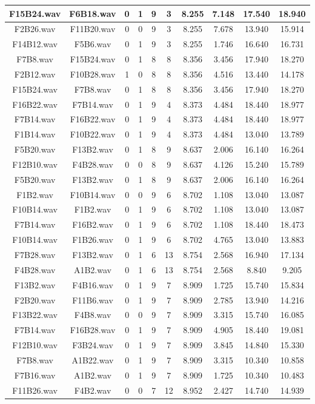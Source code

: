 \documentclass[11pt,a4paper]{book}
\begin{document}
\begin{longtable}[c]{|c|c|c|c|c|c|c|c|c|c|}
F15B24.wav&F6B18.wav&0&1&9&3&8.255&7.148&17.540&18.940\\ \hline
F2B26.wav&F11B20.wav&0&0&9&3&8.255&7.678&13.940&15.914\\ \hline
F14B12.wav&F5B6.wav&0&1&9&3&8.255&1.746&16.640&16.731\\ \hline
F7B8.wav&F15B24.wav&0&1&8&8&8.356&3.456&17.940&18.270\\ \hline
F2B12.wav&F10B28.wav&1&0&8&8&8.356&4.516&13.440&14.178\\ \hline
F15B24.wav&F7B8.wav&0&1&8&8&8.356&3.456&17.940&18.270\\ \hline
F16B22.wav&F7B14.wav&0&1&9&4&8.373&4.484&18.440&18.977\\ \hline
F7B14.wav&F16B22.wav&0&1&9&4&8.373&4.484&18.440&18.977\\ \hline
F1B14.wav&F10B22.wav&0&1&9&4&8.373&4.484&13.040&13.789\\ \hline
F5B20.wav&F13B2.wav&0&1&8&9&8.637&2.006&16.140&16.264\\ \hline
F12B10.wav&F4B28.wav&0&0&8&9&8.637&4.126&15.240&15.789\\ \hline
F5B20.wav&F13B2.wav&0&1&8&9&8.637&2.006&16.140&16.264\\ \hline
F1B2.wav&F10B14.wav&0&0&9&6&8.702&1.108&13.040&13.087\\ \hline
F10B14.wav&F1B2.wav&0&1&9&6&8.702&1.108&13.040&13.087\\ \hline
F7B14.wav&F16B2.wav&0&1&9&6&8.702&1.108&18.440&18.473\\ \hline
F10B14.wav&F1B26.wav&0&1&9&6&8.702&4.765&13.040&13.883\\ \hline
F7B28.wav&F13B2.wav&0&1&6&13&8.754&2.568&16.940&17.134\\ \hline
F4B28.wav&A1B2.wav&0&1&6&13&8.754&2.568&8.840&9.205\\ \hline
F13B2.wav&F4B16.wav&0&1&9&7&8.909&1.725&15.740&15.834\\ \hline
F2B20.wav&F11B6.wav&0&1&9&7&8.909&2.785&13.940&14.216\\ \hline
F13B22.wav&F4B8.wav&0&0&9&7&8.909&3.315&15.740&16.085\\ \hline
F7B14.wav&F16B28.wav&0&1&9&7&8.909&4.905&18.440&19.081\\ \hline
F12B10.wav&F3B24.wav&0&1&9&7&8.909&3.845&14.840&15.330\\ \hline
F7B8.wav&A1B22.wav&0&1&9&7&8.909&3.315&10.340&10.858\\ \hline
F7B16.wav&A1B2.wav&0&1&9&7&8.909&1.725&10.340&10.483\\ \hline
F11B26.wav&F4B2.wav&0&0&7&12&8.952&2.427&14.740&14.939\\ \hline

\end{longtable}
\end{document}
